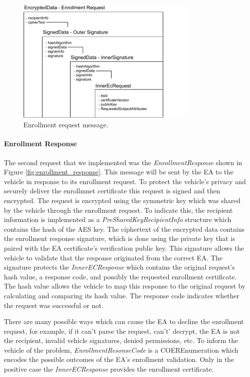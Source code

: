 \begin{figure}
	\centering
	\includegraphics[width=0.8\textwidth]{Figures/enrollmentrequest}
	\caption{\label{fig:enrollment_request}Enrollment request message.}
\end{figure}

\paragraph{Enrollment Response}
The second request that we implemented was the \textit{EnrollmentResponse} shown in Figure \ref{fig:enrollment_response}. This message will be sent by the EA to the vehicle in response to its enrollment request. To protect the vehicle's privacy and securely deliver the enrollmnet certificate this request is signed and then encrypted. The request is encrypted using the symmetric key which was shared by the vehicle through the enrollment request. To indicate this, the recipient information is implemented as a \textit{PreSharedKeyRecipientInfo} structure which contains the hash of the AES key. The ciphertext of the encrypted data contains the enrollment response signature, which is done using the private key that is paired with the EA certificate's verification public key. This signature allows the vehicle to validate that the response originated from the correct EA. The signature protects the \textit{InnerECResponse} which contains the original request's hash value, a response code, and possibly the requested enrollment certificate. The hash value allows the vehicle to map this response to the original request by calculating and comparing its hash value. The response code indicates whether the request was successful or not. 

There are many possible ways which can cause the EA to decline the enrollment request, for example, if it can't parse the request, can't' decrypt, the EA is not the recipient, invalid vehicle signatures, denied permissions, etc. To inform the vehicle of the problem, \textit{EnrollmentResonseCode} is a COEREnumeration which encodes the possible outcomes of the EA's enrollment validation. Only in the positive case the \textit{InnerECResponse} provides the enrollment certificate. 

